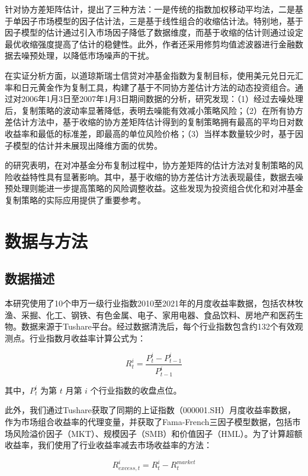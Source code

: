 \documentclass[12pt, a4paper]{article}
\begin{document}
针对协方差矩阵估计，\citet{sun2019covariance}提出了三种方法：一是传统的指数加权移动平均法，二是基于单因子市场模型的因子估计法，三是基于线性组合的收缩估计法。特别地，基于因子模型的估计通过引入市场因子降低了数据维度，而基于收缩的估计则通过设定最优收缩强度提高了估计的稳健性。此外，作者还采用修剪均值滤波器进行金融数据去噪预处理，以降低市场噪声的干扰。

在实证分析方面，\citet{sun2019covariance}以道琼斯瑞士信贷对冲基金指数为复制目标，使用美元兑日元汇率和日元黄金作为复制工具，构建了基于不同协方差估计方法的动态投资组合。通过对2006年1月3日至2007年1月3日期间数据的分析，研究发现：（1）经过去噪处理后，复制策略的波动率显著降低，表明去噪能有效减小策略风险；（2）在所有协方差估计方法中，基于收缩的协方差矩阵估计得到的复制策略拥有最高的平均日对数收益率和最低的标准差，即最高的单位风险价格；（3）当样本数量较少时，基于因子模型的估计并未展现出降维方面的优势。

\citet{sun2019covariance}的研究表明，在对冲基金分布复制过程中，协方差矩阵的估计方法对复制策略的风险收益特性具有显著影响。其中，基于收缩的协方差估计方法表现最佳，数据去噪预处理则能进一步提高策略的风险调整收益。这些发现为投资组合优化和对冲基金复制策略的实际应用提供了重要参考。

\section{数据与方法}

\subsection{数据描述}
本研究使用了10个申万一级行业指数2010至2021年的月度收益率数据，包括农林牧渔、采掘、化工、钢铁、有色金属、电子、家用电器、食品饮料、房地产和医药生物。数据来源于Tushare平台。经过数据清洗后，每个行业指数包含约132个有效观测点。行业指数月收益率计算公式为：

\begin{equation}
R_{t}^i = \frac{P_{t}^i - P_{t-1}^i}{P_{t-1}^i}
\end{equation}

其中，$P_t^i$ 为第 $t$ 月第 $i$ 个行业指数的收盘点位。

此外，我们通过Tushare获取了同期的上证指数（000001.SH）月度收益率数据，作为市场组合收益率的代理变量，并获取了Fama-French三因子模型数据，包括市场风险溢价因子（MKT）、规模因子（SMB）和价值因子（HML）。为了计算超额收益率，我们使用了行业收益率减去市场收益率的方法：

\begin{equation}
R_{excess,t}^i = R_{t}^i - R_{t}^{market}
\end{equation}
\end{document}
